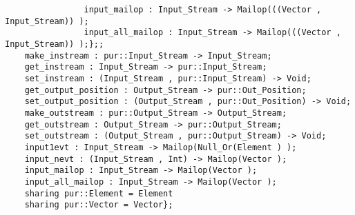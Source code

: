 \begin{verbatim}
                input_mailop : Input_Stream -> Mailop(((Vector , Input_Stream)) );
                input_all_mailop : Input_Stream -> Mailop(((Vector , Input_Stream)) );};;
    make_instream : pur::Input_Stream -> Input_Stream;
    get_instream : Input_Stream -> pur::Input_Stream;
    set_instream : (Input_Stream , pur::Input_Stream) -> Void;
    get_output_position : Output_Stream -> pur::Out_Position;
    set_output_position : (Output_Stream , pur::Out_Position) -> Void;
    make_outstream : pur::Output_Stream -> Output_Stream;
    get_outstream : Output_Stream -> pur::Output_Stream;
    set_outstream : (Output_Stream , pur::Output_Stream) -> Void;
    input1evt : Input_Stream -> Mailop(Null_Or(Element ) );
    input_nevt : (Input_Stream , Int) -> Mailop(Vector );
    input_mailop : Input_Stream -> Mailop(Vector );
    input_all_mailop : Input_Stream -> Mailop(Vector );
    sharing pur::Element = Element
    sharing pur::Vector = Vector};
\end{verbatim}
